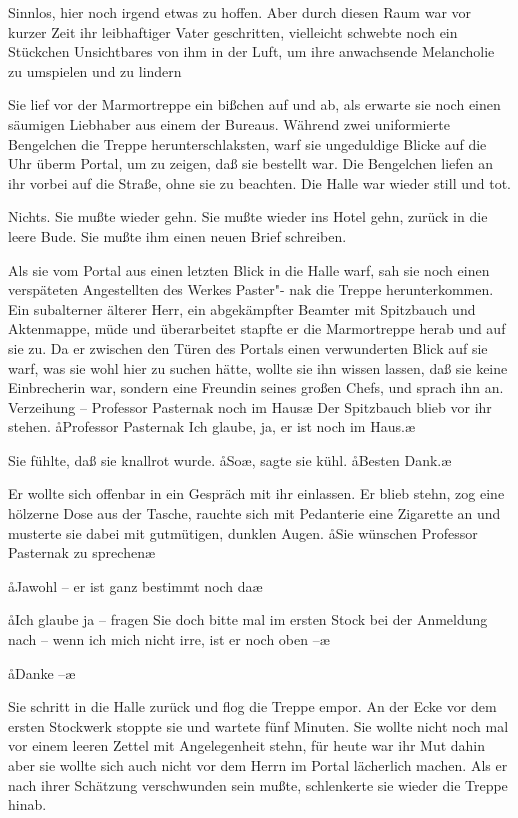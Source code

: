 Sinnlos, hier noch irgend etwas zu hoffen. Aber durch diesen
Raum war vor kurzer Zeit ihr leibhaftiger Vater geschritten,
vielleicht schwebte noch ein Stückchen Unsichtbares von ihm
in der Luft, um ihre anwachsende Melancholie zu umspielen
und zu lindern\frag{}

Sie lief vor der Marmortreppe ein bißchen auf und ab, als
erwarte sie noch einen säumigen Liebhaber aus einem der
Bureaus. Während zwei uniformierte Bengelchen die Treppe
herunterschlaksten, warf sie ungeduldige Blicke auf die Uhr
überm Portal, um zu zeigen, daß sie bestellt war. Die
Bengelchen liefen an ihr vorbei auf die Straße, ohne sie zu
beachten. Die Halle war wieder still und tot.

Nichts. Sie mußte wieder gehn. Sie mußte wieder ins Hotel
gehn, zurück in die leere Bude. Sie mußte ihm einen neuen
Brief schreiben.

Als sie vom Portal aus einen letzten Blick in die Halle warf,
sah sie noch einen verspäteten Angestellten des Werkes Paster"-%
nak die Treppe herunterkommen. Ein subalterner älterer Herr,
ein abgekämpfter Beamter mit Spitzbauch und Aktenmappe,
müde und überarbeitet stapfte er die Marmortreppe herab
und auf sie zu. Da er zwischen den Türen des Portals einen
verwunderten Blick auf sie warf, was sie wohl hier zu suchen
hätte, wollte sie ihn wissen lassen, daß sie keine Einbrecherin
war, sondern eine Freundin seines großen Chefs, und sprach
ihn an. \aanah{}Verzeihung -- Professor Pasternak noch im Haus\frag{}\ae{}
Der Spitzbauch blieb vor ihr stehen. \aa{}Professor Pasternak\frag{}
Ich glaube, ja, er ist noch im Haus.\ae{}

Sie fühlte, daß sie knallrot wurde. \aa{}So\frag{}\ae{}, sagte sie kühl.
\aa{}Besten Dank.\ae{}

Er wollte sich offenbar in ein Gespräch mit ihr einlassen. Er
blieb stehn, zog eine hölzerne Dose aus der Tasche, rauchte
sich mit Pedanterie eine Zigarette an und musterte sie dabei
mit gutmütigen, dunklen Augen. \aa{}Sie wünschen Professor
Pasternak zu sprechen\frag{}\ae{}

\aa{}Jawohl -- er ist ganz bestimmt noch da\frag{}\ae{}

\aa{}Ich glaube ja -- fragen Sie doch bitte mal im ersten Stock bei der
Anmeldung nach -- wenn ich mich nicht irre, ist er noch oben --\ae{}

\aa{}Danke --\ae{}

Sie schritt in die Halle zurück und flog die Treppe empor.
An der Ecke vor dem ersten Stockwerk stoppte sie und wartete
fünf Minuten. Sie wollte nicht noch mal vor einem leeren
Zettel mit \haa{}Angelegenheit\hae{} stehn, für heute war ihr Mut
dahin\dopp{} aber sie wollte sich auch nicht vor dem Herrn im Portal
lächerlich machen. Als er nach ihrer Schätzung verschwunden
sein mußte, schlenkerte sie wieder die Treppe hinab.


